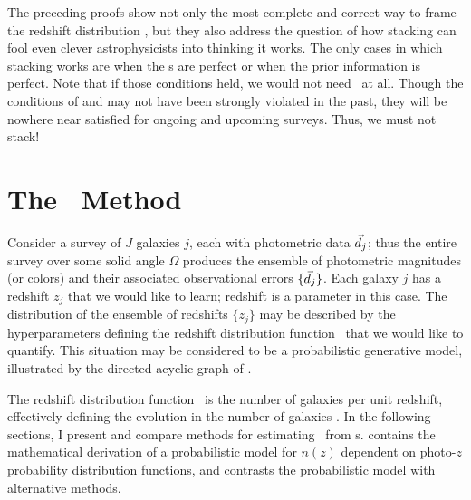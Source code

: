 The preceding proofs show not only the most complete and correct way to frame the redshift distribution \Nz, but they also address the question of how stacking can fool even clever astrophysicists into thinking it works.
The only cases in which stacking works are when the \pzpdf s are perfect or when the prior information is perfect.
Note that if those conditions held, we would not need \lsst\ at all.
Though the conditions of  and  may not have been strongly violated in the past, they will be nowhere near satisfied for ongoing and upcoming surveys.
Thus, we must not stack!

\section{The \Chippr\ Method}


Consider a survey of $J$ galaxies $j$, each with photometric data $\vec{d}_{j}$; thus the entire survey over some solid angle $\Omega$ produces the ensemble of photometric magnitudes (or colors) and their associated observational errors $\{\vec{d}_{j}\}$.  
Each galaxy $j$ has a redshift $z_{j}$ that we would like to learn; redshift is a parameter in this case.  
The distribution of the ensemble of redshifts $\{z_{j}\}$ may be described by the hyperparameters defining the redshift distribution function \nz\ that we would like to quantify.  
This situation may be considered to be a probabilistic generative model, illustrated by the directed acyclic graph of .  

The redshift distribution function \nz\ is the number of galaxies per unit redshift, effectively defining the evolution in the number of galaxies \citep{Menard2013}.  
In the following sections, I present and compare methods for estimating \nz\ from \pzpdf s.  
 contains the mathematical derivation of a probabilistic model for $n(z)$ dependent on photo-$z$ probability distribution functions, and  contrasts the probabilistic model with alternative methods.

